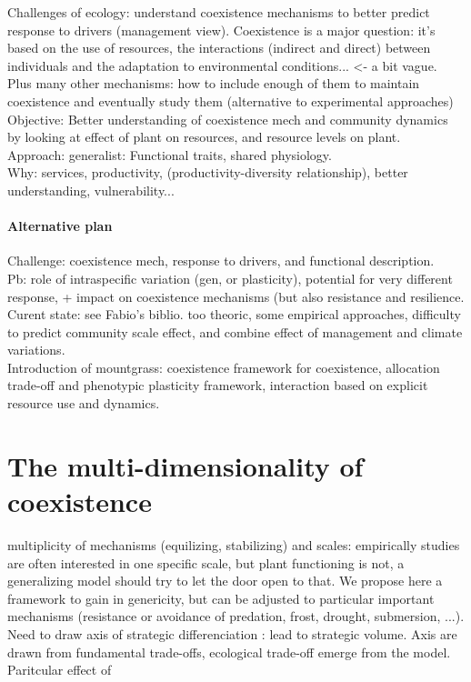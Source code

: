 \documentclass[review]{elsarticle}
\begin{document}
Challenges of ecology: understand coexistence mechanisms to better predict response to drivers (management view). Coexistence is a major question: it's based on the use of resources, the interactions (indirect and direct) between individuals and the adaptation to environmental conditions... <- a bit vague. Plus many other mechanisms: how to include enough of them to maintain coexistence and eventually study them (alternative to experimental approaches)\\
Objective: Better understanding of coexistence mech and community dynamics by looking at effect of plant on resources, and resource levels on plant.\\
Approach: generalist: Functional traits, shared physiology.\\
Why: services, productivity, (productivity-diversity relationship), better understanding, vulnerability...

\paragraph{Alternative plan}

Challenge: coexistence mech, response to drivers, and functional description.\\
Pb: role of intraspecific variation (gen, or plasticity), potential for very different response, + impact on coexistence mechanisms (but also resistance and resilience.\\
Curent state: see Fabio's biblio. too theoric, some empirical approaches, difficulty to predict community scale effect, and combine effect of management and climate variations.\\
Introduction of mountgrass: coexistence framework for coexistence, allocation trade-off and phenotypic plasticity framework, interaction based on explicit resource use and dynamics.


\section{The multi-dimensionality of coexistence}
multiplicity of mechanisms (equilizing, stabilizing) and scales: empirically studies are often interested in one specific scale, but plant functioning is not, a generalizing model should try to let the door open to that. We propose here a framework to gain in genericity, but can be adjusted to particular important mechanisms (resistance or avoidance of predation, frost, drought, submersion, ...).\\
Need to draw axis of strategic differenciation : lead to strategic volume. Axis are drawn from fundamental trade-offs, ecological trade-off emerge from the model.\\
Paritcular effect of 
\end{document}
